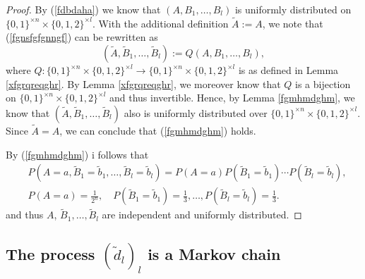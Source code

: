 \documentclass[a4paper,aps,floatfix]{revtex4}
\begin{document}
\begin{proof}
By (\ref{fdbdaha}) we know that $(A,B_1,\ldots,B_l)$ is uniformly distributed on $\{0,1\}^{\times n}\times \{0,1,2\}^{\times l}$.
With the additional definition $\tilde{A} := A$, we note that (\ref{fgnsfgfgnngf}) can be rewritten as
\begin{equation}
(\tilde{A},\tilde{B}_1,\ldots,\tilde{B}_l) := Q(A,B_1,\ldots,B_l),
\end{equation}
where $Q:\{0,1\}^{\times n}\times \{0,1,2\}^{\times l}\rightarrow \{0,1\}^{\times n}\times \{0,1,2\}^{\times l}$ is as defined in Lemma
\ref{xfgrqreqghr}. By Lemma \ref{xfgrqreqghr}, we moreover know that $Q$ is a bijection on $\{0,1\}^{\times n}\times \{0,1,2\}^{\times l}$ and thus invertible. Hence, by Lemma \ref{fgmhmdghm}, we know that $(\tilde{A},\tilde{B}_1,\ldots,\tilde{B}_l)$ also is uniformly distributed over $\{0,1\}^{\times n}\times \{0,1,2\}^{\times l}$. Since $\tilde{A} = A$, we can conclude that (\ref{fgmhmdghm}) holds. 

By (\ref{fgmhmdghm}) i follows that 
\begin{equation}
\begin{split}
& P(A = a, \tilde{B}_1 = \tilde{b}_1,\ldots, \tilde{B}_l = \tilde{b}_l) = P(A = a)P(\tilde{B}_1 = \tilde{b}_1)\cdots P(\tilde{B}_l = \tilde{b}_l),\\
& P(A =a) = \frac{1}{2^n},\quad P(\tilde{B}_1 = \tilde{b}_1) = \frac{1}{3},\ldots,P(\tilde{B}_l = \tilde{b}_l) = \frac{1}{3}.
\end{split}
\end{equation}
and thus $A$, $\tilde{B}_1,\ldots,\tilde{B}_l$ are independent and uniformly distributed.

\end{proof}



\subsection{\label{ndtehntdhmt} The process $(\tilde{d}_l)_{l}$ is a Markov chain}
\end{document}

